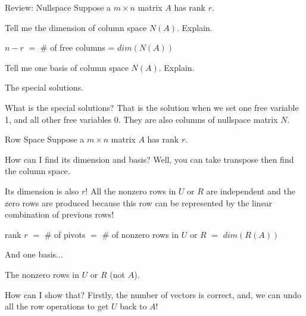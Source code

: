 \documentclass{beamer}
\begin{document}
\begin{frame}{Review: Nullspace}
Suppose a $m \times n$ matrix $A$ has rank $r$.

\vspace{3pt}
Tell me the dimension of column space $N(A)$. Explain.

\begin{center}
    $n-r$ $=$ \# of free columns = $dim(N(A))$
\end{center}

Tell me one basis of column space $N(A)$. Explain.

\begin{center}
    The special solutions.
\end{center}

What is the special solutions? That is the solution when we set one free variable 1, and all other free variables 0. They are also columns of nullspace matrix $N$.
\end{frame}

\begin{frame}{Row Space}
Suppose a $m \times n$ matrix $A$ has rank $r$.

\vspace{3pt}
How can I find its dimension and basis? Well, you can take transpose then find the column space.

\vspace{3pt}
Its dimension is also $r$! All the nonzero rows in $U$ or $R$ are independent and the zero rows are produced because this row can be represented by the linear combination of previous rows!

\begin{center}
    rank $r$ $=$ \# of pivots $=$ \# of nonzero rows in $U$ or $R$ $=$ $dim(R(A))$
\end{center}

And one basis...

\begin{center}
    The nonzero rows in $U$ or $R$ (not $A$).
\end{center}

How can I show that? Firstly, the number of vectors is correct, and, we can undo all the row operations to get $U$ back to $A$!
\end{frame}
\end{document}

